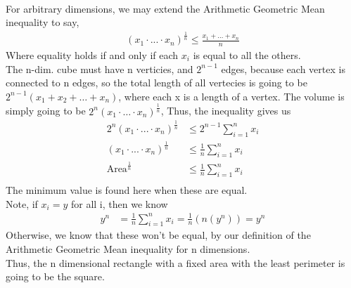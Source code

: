 \documentclass[letterpaper,12pt]{article}
\theoremstyle{definition}
\begin{document}
\\
For arbitrary dimensions, we may extend the Arithmetic Geometric Mean inequality to say,
\begin{align*}
    (x_1 \cdot ... \cdot x_n)^{\frac{1}{n}} \leq \frac{x_1+\dots+x_n}{n}
\end{align*}
Where equality holds if and only if each $x_i$ is equal to all the others.\\
The n-dim. cube must have n verticies, and $2^{n-1}$ edges, because each vertex is connected to n edges, so the total length of all vertecies is going to be $2^{n-1}(x_1+x_2+\dots+x_n)$, where each x is a length of a vertex.
The volume is simply going to be $2^n(x_1\cdot \dots \cdot x_n)^{\frac{1}{n}}$, Thus, the inequality gives us
\begin{align*}
    2^{n}(x_1\cdot ... \cdot x_n)^{\frac{1}{n}} & \leq 2^{n-1} \sum_{i=1}^n x_i\\
    (x_1\cdot ... \cdot x_n)^{\frac{1}{n}} & \leq \frac{1}{n}\sum_{i=1}^n x_i\\
    \text{Area}^{\frac{1}{n}} & \leq \frac{1}{n}\sum_{i=1}^n x_i \\
\end{align*}
The minimum value is found here when these are equal.\\
Note, if $x_i = y$ for all i, then we know
\begin{align*}
    y^n & = \frac{1}{n}\sum_{i=1}^n x_i = \frac{1}{n} (n(y^n)) = y^n
\end{align*}
Otherwise, we know that these won't be equal, by our definition of the Arithmetic Geometric Mean inequality for n dimensions.\\
Thus, the n dimensional rectangle with a fixed area with the least perimeter is going to be the square.

\\
\end{document}
